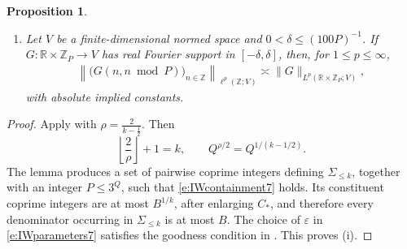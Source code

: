 \documentclass[12pt,reqno]{amsart}
\numberwithin{equation}{section}
\newtheorem{proposition}[equation]{Proposition}
\theoremstyle{definition}
\theoremstyle{remark}
\begin{document}
\begin{proposition}
\begin{enumerate}[label=\textup{(\roman*)}]
\item
Let \(V\) be a finite-dimensional normed space and
\(0<\delta\leq(100P)^{-1}\).  If
\(G:\mathbb R\times\mathbb Z_P\to V\) has real Fourier support in
\([-\delta,\delta]\), then, for \(1\leq p\leq\infty\),
\begin{align}\label{e:IWdiagonal7}
 \left\|
 \bigl(G(n,n\bmod P)\bigr)_{n\in\mathbb Z}
 \right\|_{\ell^p(\mathbb Z;V)}
 \asymp
 \|G\|_{L^p(\mathbb R\times\mathbb Z_P;V)},
\end{align}
with absolute implied constants.
\end{enumerate}
\end{proposition}

\begin{proof}
Apply \cite[Lemma~5.1]{Tao2021} with $\rho=\frac{2}{k-\frac12}.$
Then
\[
 \left\lfloor\frac2\rho\right\rfloor+1=k,
 \qquad
 Q^{\rho/2}=Q^{1/(k-1/2)}.
\]
The lemma produces a set of pairwise coprime integers defining
\(\Sigma_{\leq k}\), together with an integer \(P\leq3^Q\), such that
\eqref{e:IWcontainment7} holds.  Its constituent coprime integers are
at most \(B^{1/k}\), after enlarging \(C_*\), and therefore every
denominator occurring in \(\Sigma_{\leq k}\) is at most \(B\).
The choice of \(\varepsilon\) in \eqref{e:IWparameters7} satisfies
the goodness condition in \cite[(5.1)]{Tao2021}.  This proves \textup{(i)}.





\end{proof}
\end{document}
